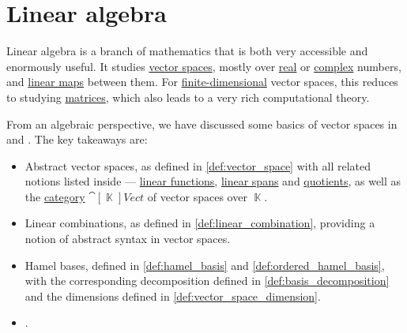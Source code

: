 \chapter{Linear algebra}\label{ch:linear_algebra}

Linear algebra is a branch of mathematics that is both very accessible and enormously useful. It studies \hyperref[def:vector_space]{vector spaces}, mostly over \hyperref[def:real_numbers]{real} or \hyperref[def:complex_numbers]{complex} numbers, and \hyperref[def:linear_function]{linear maps} between them. For \hyperref[thm:vector_space_dimension]{finite-dimensional} vector spaces, this reduces to studying \hyperref[def:array/matrix]{matrices}, which also leads to a very rich computational theory.

From an algebraic perspective, we have discussed some basics of vector spaces in  and . The key takeaways are:
\begin{itemize}
  \item Abstract vector spaces, as defined in \cref{def:vector_space} with all related notions listed inside --- \hyperref[def:linear_function]{linear functions}, \hyperref[def:linear_span]{linear spans} and \hyperref[def:vector_space/quotient]{quotients}, as well as the \hyperref[def:category]{category} \( \cat[\BbbK]{Vect} \) of vector spaces over \( \BbbK \).

  \item Linear combinations, as defined in \cref{def:linear_combination}, providing a notion of abstract syntax in vector spaces.

  \item Hamel bases, defined in \cref{def:hamel_basis} and \cref{def:ordered_hamel_basis}, with the corresponding decomposition defined in \cref{def:basis_decomposition} and the dimensions defined in \cref{def:vector_space_dimension}.

  \item {}.
\end{itemize}
